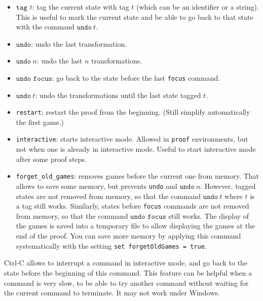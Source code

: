 \documentclass{article}
\begin{document}
\begin{itemize}
\item $\texttt{tag }t$: tag the current state with tag $t$ (which can be an identifier or a string).
  This is useful to mark the current state and be able to go back to that state with the command $\texttt{undo}\ t$.

\item $\texttt{undo}$: undo the last transformation.

\item $\texttt{undo}\ n$: undo the last $n$ transformations.

\item $\texttt{undo\ focus}$: go back to the state before the last \texttt{focus} command.
  
\item $\texttt{undo}\ t$: undo the transformations until the last state tagged $t$.

\item \texttt{restart}: restart the proof from the beginning.
(Still simplify automatically the first game.)

\item \texttt{interactive}: starts interactive mode.
Allowed in \texttt{proof} environments, but not when one is
already in interactive mode. Useful to start interactive mode
after some proof steps.

\item \texttt{forget\_old\_games}: removes games before the current one
from memory. That allows to save some memory, but prevents \texttt{undo}
and $\texttt{undo}\ n$.
However, tagged states are not removed from memory, so that the command
$\texttt{undo}\ t$ where $t$ is a tag still works.
Similarly, states before \texttt{focus} commands are not removed from 
memory, so that the command $\texttt{undo\ focus}$ still works.
The display of the games is saved into a temporary file to allow
displaying the games at the end of the proof.
You can save more memory by applying this command systematically with
the setting \texttt{set forgetOldGames = true}.

\end{itemize}
Ctrl-C allows to interrupt a command in interactive mode,
and go back to the state before the beginning of this command.
This feature can be helpful when a command is very slow,
to be able to try another command without waiting for the current command 
to terminate. It may not work under Windows.
\end{document}
